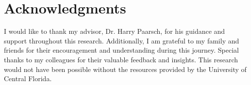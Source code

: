 \section{Acknowledgments}

I would like to thank my advisor, Dr. Harry Paarsch, for his guidance and support throughout this research. Additionally, I am grateful to my family and friends for their encouragement and understanding during this journey. Special thanks to my colleagues for their valuable feedback and insights. This research would not have been possible without the resources provided by the University of Central Florida.

\newpage
